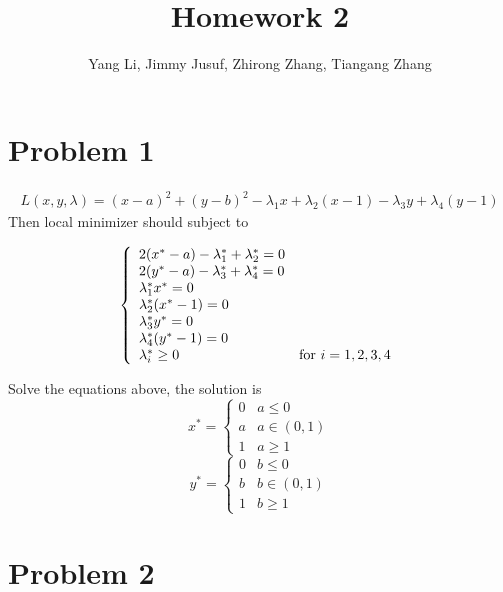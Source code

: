 \documentclass{article}
\title{Homework 2}
\author{Yang Li, Jimmy Jusuf, Zhirong Zhang, Tiangang Zhang }
\begin{document}
\maketitle


\section{Problem 1}
\begin{eqnarray*}
L(x,y,\lambda)=(x-a)^2+(y-b)^2-\lambda_1 x+\lambda_2 (x-1)-\lambda_3 y +\lambda_4 (y-1)
\end{eqnarray*}
Then local minimizer should subject to

\begin{equation}  
\left\{  
             \begin{array}{ll}
             2(x^*-a)-\lambda_1^*+\lambda_2^*=0\\  
             2(y^*-a)-\lambda_3^*+\lambda_4^*=0\\
             \lambda_1^* x^*=0\\
             \lambda_2^*(x^*-1)=0\\
             \lambda_3^* y^*=0\\
             \lambda_4^*(y^*-1)=0\\
             \lambda_i^* \geq 0 & \textnormal{for~} i=1,2,3,4
             \end{array}  
\right.  
\end{equation}  

Solve the equations above, the solution is
\begin{equation}  
x^*=
\left\{  
             \begin{array}{ll}
             0 & a\leq 0\\
             a & a \in (0,1) \\
             1 & a \geq 1
             \end{array}  
\right.  
\end{equation} 
\begin{equation}  
y^*=
\left\{  
             \begin{array}{ll}
             0 & b\leq 0\\
             b & b \in (0,1) \\
             1 & b \geq 1
             \end{array}  
\right.  
\end{equation}  

\section{Problem 2}
\end{document}
